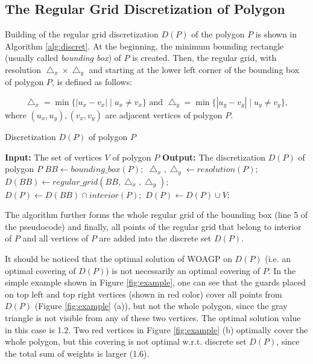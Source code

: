 \documentclass[runningheads,a4paper]{elsarticle}
\begin{document}
	
	\subsection{The Regular Grid Discretization of Polygon}\label{sec:regulardiscretization}
	Building of the regular grid discretization $D(P)$ of the polygon $P$ is shown in Algorithm \ref{alg:discret}.  At the beginning, the minimum bounding rectangle (usually called \textit{bounding box}) of $P$ is created. Then, the  regular grid, with resolution $\bigtriangleup_{x}\times\bigtriangleup_{y}$ and starting at the lower left corner of the bounding box of polygon $P$, is defined as follows:

	\begin{equation}
         \bigtriangleup_{x}=\min\{ |u_{x}-v_{x}|\mid u_{x}\neq v_{x}\} \mbox{ and }
         \bigtriangleup_{y}=\min\{ |u_{y}-v_{y}|\mid u_{y}\neq v_{y}\},
 	\end{equation}
where $ (u_{x},u_{y}),(v_{x},v_{y})$ are adjacent vertices of polygon $P$.
	
	\begin{algorithm}[!t]
		\caption{Discretization $D(P)$ of polygon $P$}\label{alg:discret}
		\begin{algorithmic}[1]
			\State \textbf{Input:} The set of vertices $V$ of polygon $P$
			\State \textbf{Output:} The discretization $D(P)$ of polygon $P$
			\State $BB \gets bounding\_box(P);$
			\State $\bigtriangleup_{x},\bigtriangleup_{y} \gets resolution(P);$
			\State $D(BB) \gets regular\_grid(BB,\bigtriangleup_{x},\bigtriangleup_{y});$
			\State $D(P) \gets D(BB) \cap interior(P);$
			\State $D(P) \gets D(P) \cup V;$
		\end{algorithmic}
	\end{algorithm}
The algorithm further forms the whole regular grid of the bounding box (line 5 of the pseudocode) and finally, all points of the regular grid that belong to interior of $P$ and all vertices of $P$ are added into the discrete set $D(P)$.
	
	It should be noticed that the optimal solution of WOAGP on $D(P)$ (i.e. an optimal covering of $D(P)$) is not necessarily  an optimal covering of $P$. In the simple example shown in Figure \ref{fig:example}, one can see that the guards placed on top left and top right vertices (shown in red color) cover all points from $D(P)$ (Figure \ref{fig:example} (a)), but not the whole polygon, since the gray triangle is not visible from any of these two vertices. The optimal solution value in this case is 1.2. Two red vertices in Figure \ref{fig:example} (b) optimally cover the whole polygon, but this covering is not optimal w.r.t. discrete set $D(P)$, since the total sum of weights is larger (1.6).
	
\end{document}
